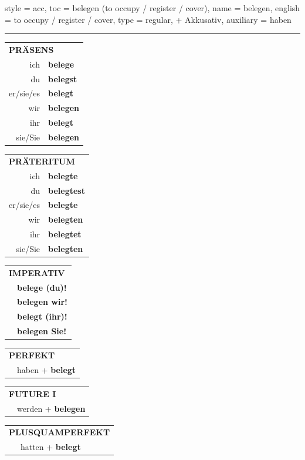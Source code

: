 \begin{verbentry}{
  style = {acc},
  toc = {belegen (to occupy / register / cover)},
  name = {belegen},
  english = {to occupy / register / cover},
  type = {regular, + Akkusativ},
  auxiliary = {haben}
}


\vspace{5pt}
\hrule
\vspace{5pt}

\begin{tabular}{rl}
\multicolumn{2}{l}{\textbf{PRÄSENS}}\\
ich & \textbf{belege}\\
du & \textbf{belegst}\\
er/sie/es & \textbf{belegt}\\
wir & \textbf{belegen}\\
ihr & \textbf{belegt}\\
sie/Sie & \textbf{belegen}\\
\end{tabular}
\hfill
\begin{tabular}{rl}
\multicolumn{2}{l}{\textbf{PRÄTERITUM}}\\
ich & \textbf{belegte}\\
du & \textbf{belegtest}\\
er/sie/es & \textbf{belegte}\\
wir & \textbf{belegten}\\
ihr & \textbf{belegtet}\\
sie/Sie & \textbf{belegten}\\
\end{tabular}
\hfill
\begin{tabular}{rl}
\multicolumn{2}{l}{\textbf{IMPERATIV}}\\
& \textbf{belege (du)!}\\
& \textbf{belegen wir!}\\
& \textbf{belegt (ihr)!}\\
& \textbf{belegen Sie!}\\
\end{tabular}

\vspace{10pt}

\begin{tabular}{rl}
\multicolumn{2}{l}{\textbf{PERFEKT}}\\
& haben + \textbf{belegt}\\
\end{tabular}
\hfill
\begin{tabular}{rl}
\multicolumn{2}{l}{\textbf{FUTURE I}}\\
& werden + \textbf{belegen}\\
\end{tabular}
\hfill
\begin{tabular}{rl}
\multicolumn{2}{l}{\textbf{PLUSQUAMPERFEKT}}\\
& hatten + \textbf{belegt}\\
\end{tabular}


\end{verbentry}
